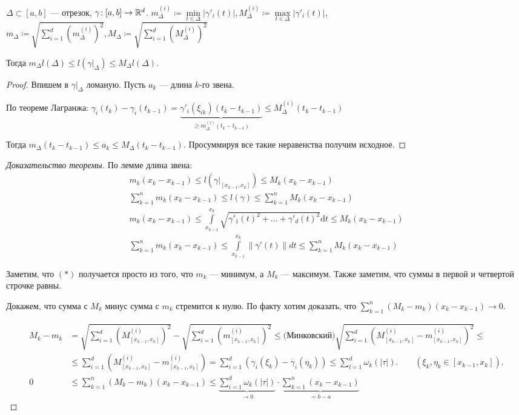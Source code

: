 \begin{lemma}
    $\Delta \subset [a, b]$ --- отрезок, $\gamma\!: [a, b] \to \mathbb{R}^d$.  $m_\Delta^{(i)} \coloneqq \min\limits_{t \in \Delta}|\gamma'_i(t)|, M_\Delta^{(i)} \coloneqq \max\limits_{t \in \Delta}|\gamma'_i(t)|$, $m_\Delta \coloneqq \sqrt{\sum\limits_{i=1}^d (m_\Delta^{(i)})^2}, M_\Delta \coloneqq \sqrt{\sum\limits_{i=1}^d (M_\Delta^{(i)})^2}$

    Тогда $m_\Delta l(\Delta) \le l(\gamma \Big|_\Delta) \le M_\Delta l(\Delta)$.
\end{lemma}
\begin{proof}
    Впишем в $\gamma \Big|_\Delta$ ломаную. Пусть  $a_k$ --- длина  $k$-го звена.

    По теореме Лагранжа:  $\gamma_i(t_k) - \gamma_i(t_{k-1}) = \underbrace{\gamma'_i(\xi_{ik})(t_k - t_{k-1})}_{\ge m_\Delta^{(i)}(t_k - t_{k-1})} \le M_\Delta^{(i)} (t_k - t_{k-1})$

    Тогда $m_\Delta (t_k - t_{k-1}) \le a_k \le M_\Delta(t_k - t_{k-1})$. Просуммируя все такие неравенства получим исходное.
\end{proof}
\begin{proof}[Доказательство теоремы]
   По лемме длина звена:
   \begin{align*}
       m_k(x_k - x_{k-1}) \le l(\gamma \Big|_{[x_{k-1}, x_k]}) \le M_k(x_k - x_{k-1}) \\
       \sum_{k=1}^n m_k (x_k - x_{k-1}) \le l(\gamma) \le \sum_{k=1}^n M_k(x_k - x_{k-1}) \\
       m_k(x_k - x_{k-1}) \le \int\limits_{x_{k-1}}^{x_k} \sqrt{\gamma'_1(t)^2 + \ldots + \gamma'_d(t)^2}\mathrm{d}t \le M_k(x_{k} - x_{k-1})\tag{*}\\
       \sum\limits_{k=1}^n m_k(x_k - x_{k-1}) \le \int\limits_{x_{k-1}}^{x_k} \|\gamma'(t)\| dt \le \sum\limits_{k=1}^n M_k(x_k - x_{k-1})
   \end{align*}
   
   Заметим, что $(*)$ получается просто из того, что $m_k$ --- минимум, а  $M_k$ --- максимум. Также заметим, что суммы в первой и четвертой строчке равны. 
   
   Докажем, что сумма с $M_k$ минус сумма с $m_k$ стремится к нулю. По факту хотим доказать, что $\sum\limits_{k=1}^n (M_k - m_k)(x_k - x_{k-1}) \to 0$. 

    \begin{align*}
        M_k - m_k &= \sqrt{\sum_{i=1}^d (M_{[x_{k-1}, x_k]}^{(i)})^2} - \sqrt{\sum_{i=1}^d (m_{[x_{k-1}, x_k]}^{(i)})^2}  \le\text{(Минковский)} \sqrt{\sum_{i=1}^d (M_{[x_{k-1}, x_k]}^{(i)} - m_{[x_{k-1}, x_k]}^{(i)})^2} \le \\ 
                  &\le \sum_{i=1}^d (M_{[x_{k-1}, x_k]}^{(i)} - m_{[x_{k-1}, x_k]}^{(i)}) = \sum_{i=1}^d (\gamma_i(\xi_k) - \gamma_i(\eta_k)) \le \sum_{l=1}^d \omega_k(|\tau|).\qquad (\xi_k,\eta_k \in [x_{k-1}, x_k]).\\
        0 &\le \sum_{k=1}^n (M_k - m_k)(x_k - x_{k-1}) \le \underbrace{\sum_{i=1}^d \omega_k(|\tau|)}_{\to 0} \cdot \underbrace{\sum_{k=1}^n (x_k - x_{k-1})}_{= b - a}
   \end{align*}
\end{proof}

